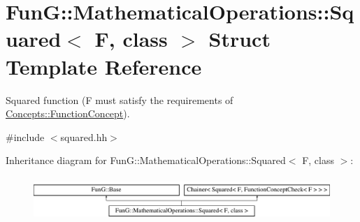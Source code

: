 \hypertarget{structFunG_1_1MathematicalOperations_1_1Squared}{\section{Fun\-G\-:\-:Mathematical\-Operations\-:\-:Squared$<$ F, class $>$ Struct Template Reference}
\label{structFunG_1_1MathematicalOperations_1_1Squared}
}


Squared function (F must satisfy the requirements of \hyperlink{structFunG_1_1Concepts_1_1FunctionConcept}{Concepts\-::\-Function\-Concept}).  




{\ttfamily \#include $<$squared.\-hh$>$}

Inheritance diagram for Fun\-G\-:\-:Mathematical\-Operations\-:\-:Squared$<$ F, class $>$\-:\begin{figure}[H]
\begin{center}
\leavevmode
\includegraphics[height=1.642229cm]{structFunG_1_1MathematicalOperations_1_1Squared}
\end{center}
\end{figure}
